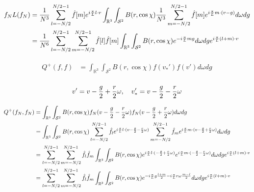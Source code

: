 \documentclass[11pt]{amsart}
\begin{document}
\color{blue}
\begin{align*}
\begin{split}
f_NL(f_N) &= \frac{1}{N^3} \sum_{l = -N/2}^{N/2-1}\hat f[m] e^{i{\pi \over L}l\cdot v} \int_{\mathbb{R}^3} \int_{\mathcal{S}^2} {B}(r,\cos\chi)  \frac{1}{N^3} \sum_{m = -N/2}^{N/2-1}\hat f[m] e^{i{\pi \over L}m\cdot (v-g)} d\omega dg \\
&=  \frac{1}{N^6}\sum_{l = -N/2}^{N/2-1}\sum_{m = -N/2}^{N/2-1}\hat f[l]\hat f[m] \int_{\mathbb{R}^3} \int_{\mathcal{S}^2} {B}(r,\cos\chi)  e^{-i{\pi \over L}mg} d\omega dg e^{i{\pi \over L}(l+m)\cdot v}
\end{split}
\end{align*}
\color{black}


\begin{align*}
\begin{split}
Q^{+}(f,f)&=  \int_{\mathbb{R}^3} \int_{\mathcal{S}^2} {B}(r,\cos\chi) f(v_*')f(v')d\omega dg \\
\end{split}
\end{align*}

\begin{equation}
v' = v - {g\over2} + {r\over2} \omega,\quad v'_* = v - {g\over2} - {r\over2} \omega
\end{equation}

\begin{align*}
\begin{split}
Q^{+}(f_N,f_N)&=  \int_{\mathbb{R}^3} \int_{\mathcal{S}^2} {B}(r,\cos\chi) f_N(v - {g\over2} - {r\over2}\omega)f_N( v - {g\over2} + {r\over2}\omega)d\omega dg \\
&=  \int_{\mathbb{R}^3} \int_{\mathcal{S}^2} {B}(r,\cos\chi)  \sum_{l = -N/2}^{N/2-1}\hat f_l e^{i{\pi \over L}l\cdot (v - {g\over2} - {r\over2}\omega)}  \sum_{m = -N/2}^{N/2-1}\hat f_m e^{i{\pi \over L}m\cdot (v - {g\over2} + {r\over2}\omega)}d\omega dg \\
&= \sum_{l = -N/2}^{N/2-1} \sum_{m = -N/2}^{N/2-1} \hat f_l \hat f_m  \int_{\mathbb{R}^3} \int_{\mathcal{S}^2} {B}(r,\cos\chi) e^{i{\pi \over L}l\cdot (- {g\over2} + {r\over2}\omega)} e^{i{\pi \over L}m\cdot (- {g\over2} - {r\over2}\omega)}d\omega dg e^{i{\pi \over L}(l+m)\cdot v}\\
&= \sum_{l = -N/2}^{N/2-1} \sum_{m = -N/2}^{N/2-1} \hat f_l \hat f_m  \int_{\mathbb{R}^3} \int_{\mathcal{S}^2} {B}(r,\cos\chi) 
e^{-i{\pi \over L} g \frac{l+m}{2} -i {\pi \over L} r\omega \frac{m-l}{2}}
d\omega dg e^{i{\pi \over L}(l+m)\cdot v}\\
\end{split}
\end{align*}
\end{document}
